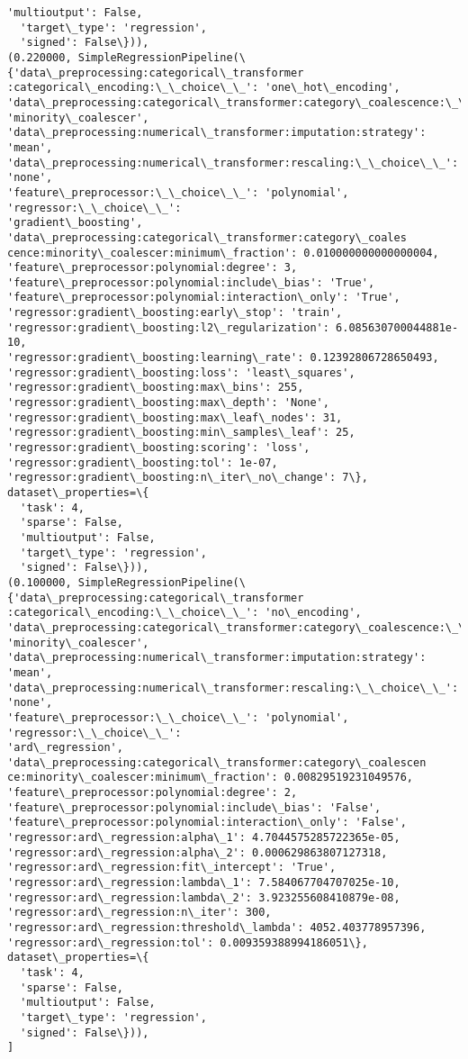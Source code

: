 \documentclass[11pt]{report}
\begin{document}
\begin{Verbatim}[commandchars=\\\{\}]
  'multioutput': False,
  'target\_type': 'regression',
  'signed': False\})),
(0.220000, SimpleRegressionPipeline(\{'data\_preprocessing:categorical\_transformer
:categorical\_encoding:\_\_choice\_\_': 'one\_hot\_encoding',
'data\_preprocessing:categorical\_transformer:category\_coalescence:\_\_choice\_\_':
'minority\_coalescer',
'data\_preprocessing:numerical\_transformer:imputation:strategy': 'mean',
'data\_preprocessing:numerical\_transformer:rescaling:\_\_choice\_\_': 'none',
'feature\_preprocessor:\_\_choice\_\_': 'polynomial', 'regressor:\_\_choice\_\_':
'gradient\_boosting', 'data\_preprocessing:categorical\_transformer:category\_coales
cence:minority\_coalescer:minimum\_fraction': 0.010000000000000004,
'feature\_preprocessor:polynomial:degree': 3,
'feature\_preprocessor:polynomial:include\_bias': 'True',
'feature\_preprocessor:polynomial:interaction\_only': 'True',
'regressor:gradient\_boosting:early\_stop': 'train',
'regressor:gradient\_boosting:l2\_regularization': 6.085630700044881e-10,
'regressor:gradient\_boosting:learning\_rate': 0.12392806728650493,
'regressor:gradient\_boosting:loss': 'least\_squares',
'regressor:gradient\_boosting:max\_bins': 255,
'regressor:gradient\_boosting:max\_depth': 'None',
'regressor:gradient\_boosting:max\_leaf\_nodes': 31,
'regressor:gradient\_boosting:min\_samples\_leaf': 25,
'regressor:gradient\_boosting:scoring': 'loss',
'regressor:gradient\_boosting:tol': 1e-07,
'regressor:gradient\_boosting:n\_iter\_no\_change': 7\},
dataset\_properties=\{
  'task': 4,
  'sparse': False,
  'multioutput': False,
  'target\_type': 'regression',
  'signed': False\})),
(0.100000, SimpleRegressionPipeline(\{'data\_preprocessing:categorical\_transformer
:categorical\_encoding:\_\_choice\_\_': 'no\_encoding',
'data\_preprocessing:categorical\_transformer:category\_coalescence:\_\_choice\_\_':
'minority\_coalescer',
'data\_preprocessing:numerical\_transformer:imputation:strategy': 'mean',
'data\_preprocessing:numerical\_transformer:rescaling:\_\_choice\_\_': 'none',
'feature\_preprocessor:\_\_choice\_\_': 'polynomial', 'regressor:\_\_choice\_\_':
'ard\_regression', 'data\_preprocessing:categorical\_transformer:category\_coalescen
ce:minority\_coalescer:minimum\_fraction': 0.00829519231049576,
'feature\_preprocessor:polynomial:degree': 2,
'feature\_preprocessor:polynomial:include\_bias': 'False',
'feature\_preprocessor:polynomial:interaction\_only': 'False',
'regressor:ard\_regression:alpha\_1': 4.7044575285722365e-05,
'regressor:ard\_regression:alpha\_2': 0.000629863807127318,
'regressor:ard\_regression:fit\_intercept': 'True',
'regressor:ard\_regression:lambda\_1': 7.584067704707025e-10,
'regressor:ard\_regression:lambda\_2': 3.923255608410879e-08,
'regressor:ard\_regression:n\_iter': 300,
'regressor:ard\_regression:threshold\_lambda': 4052.403778957396,
'regressor:ard\_regression:tol': 0.009359388994186051\},
dataset\_properties=\{
  'task': 4,
  'sparse': False,
  'multioutput': False,
  'target\_type': 'regression',
  'signed': False\})),
]
    \end{Verbatim}
\end{document}
